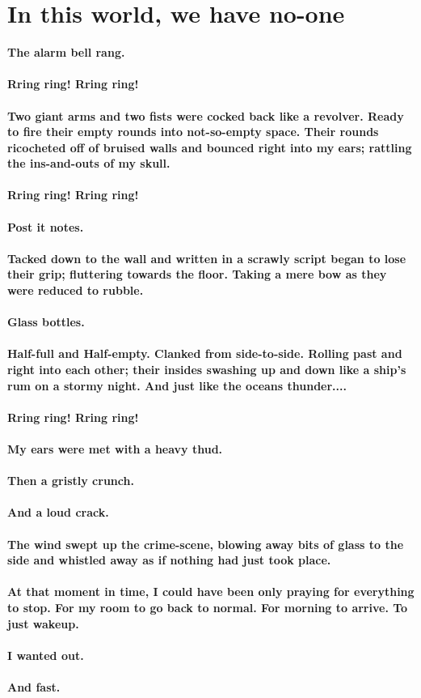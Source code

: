 \documentclass{book}
\begin{document}
\chapter{In this world, we have no-one}
\Large{\textbf{The alarm bell rang.\\\\
	Rring ring! Rring ring!\\\\
	Two giant arms and two fists were cocked back like a revolver.
	Ready to fire their empty rounds into not-so-empty space.
	Their rounds ricocheted off of bruised walls and bounced right into my ears;
	rattling the ins-and-outs of my skull.\\\\
	Rring ring! Rring ring!\\\\
	Post it notes.\\\\
	Tacked down to the wall and written in a scrawly script began to lose
	their grip; fluttering towards the floor. Taking a mere bow as they were
	reduced to rubble.\\\\
    Glass bottles.\\\\
	Half-full and Half-empty. Clanked from side-to-side.
	Rolling past and right into each other; their insides
	swashing up and down like a ship's
	rum on a stormy night.
	And just like the oceans thunder....\\\\
	Rring ring! Rring ring!\\\\
	My ears were met with a heavy thud.\\\\
	Then a gristly crunch.\\\\
	And a loud crack.\\\\
	The wind swept up the crime-scene, blowing away bits
	of glass to the side and whistled away as if
	nothing had just took place.\\\\
	At that moment in time, I could have been only praying for everything to stop.
	For my room to go back to normal. For morning to arrive. To just wakeup.\\\\
	I wanted out.\\\\
	And fast.\\\\
}}
\end{document}

